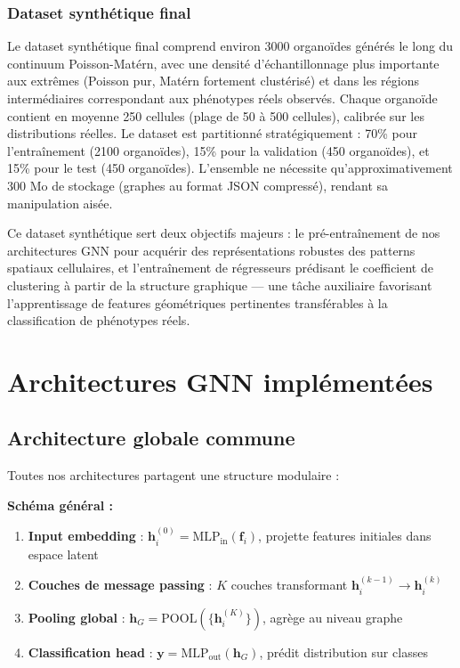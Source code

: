 \subsubsection{Dataset synthétique final}

Le dataset synthétique final comprend environ 3000 organoïdes générés le long du continuum Poisson-Matérn, avec une densité d'échantillonnage plus importante aux extrêmes (Poisson pur, Matérn fortement clustérisé) et dans les régions intermédiaires correspondant aux phénotypes réels observés. Chaque organoïde contient en moyenne 250 cellules (plage de 50 à 500 cellules), calibrée sur les distributions réelles. Le dataset est partitionné stratégiquement : 70\% pour l'entraînement (2100 organoïdes), 15\% pour la validation (450 organoïdes), et 15\% pour le test (450 organoïdes). L'ensemble ne nécessite qu'approximativement 300 Mo de stockage (graphes au format JSON compressé), rendant sa manipulation aisée.

Ce dataset synthétique sert deux objectifs majeurs : le pré-entraînement de nos architectures GNN pour acquérir des représentations robustes des patterns spatiaux cellulaires, et l'entraînement de régresseurs prédisant le coefficient de clustering à partir de la structure graphique — une tâche auxiliaire favorisant l'apprentissage de features géométriques pertinentes transférables à la classification de phénotypes réels.

\section{Architectures GNN implémentées}

\subsection{Architecture globale commune}

Toutes nos architectures partagent une structure modulaire :

\textbf{Schéma général :}
\begin{enumerate}
    \item \textbf{Input embedding} : $\mathbf{h}_i^{(0)} = \text{MLP}_{\text{in}}(\mathbf{f}_i)$, projette features initiales dans espace latent
    \item \textbf{Couches de message passing} : $K$ couches transformant $\mathbf{h}_i^{(k-1)} \rightarrow \mathbf{h}_i^{(k)}$
    \item \textbf{Pooling global} : $\mathbf{h}_G = \text{POOL}(\{\mathbf{h}_i^{(K)}\})$, agrège au niveau graphe
    \item \textbf{Classification head} : $\mathbf{y} = \text{MLP}_{\text{out}}(\mathbf{h}_G)$, prédit distribution sur classes
\end{enumerate}

